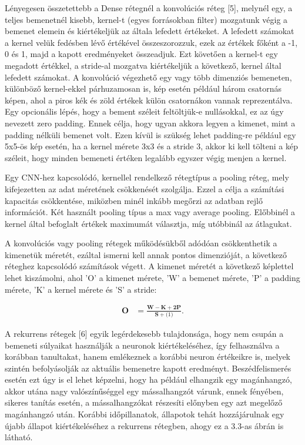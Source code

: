 Lényegesen összetettebb a Dense rétegnél a konvolúciós réteg [5], melynél egy, a teljes bemenetnél kisebb, kernel-t (egyes forrásokban filter) mozgatunk végig a bemenet elemein és kiértékeljük az általa lefedett értékeket. A lefedett számokat a kernel velük fedésben lévő értékével összeszorozzuk, ezek az értékek főként a -1, 0 és 1, majd a kapott eredményeket összeadjuk. Ezt követően a kernel-t egy megadott értékkel, a stride-al mozgatva kiértékeljük a következő, kernel által lefedett számokat. A konvolúció végezhető egy vagy több dimenziós bemeneten, különböző kernel-ekkel párhuzamosan is, kép esetén például három csatornás képen, ahol a piros kék és zöld értékek külön csatornákon vannak reprezentálva. Egy opcionális lépés, hogy a bement széleit feltöltjük-e nullásokkal, ez az úgy nevezett zero padding. Ennek célja, hogy ugyan akkora legyen a kimenet, mint a padding nélküli bemenet volt. Ezen kívül is szükség lehet padding-re például egy 5x5-ös kép esetén, ha a kernel mérete 3x3 és a stride 3, akkor ki kell tölteni a kép széleit, hogy minden bemeneti értéken legalább egyszer végig menjen a kernel.

Egy CNN-hez kapcsolódó, kernellel rendelkező rétegtípus a pooling réteg, mely kifejezetten az adat méretének csökkenését szolgálja. Ezzel a célja a számítási kapacitás csökkentése, miközben minél inkább megőrzi az adatban rejlő információt. Két használt pooling típus a max vagy average pooling. Előbbinél a kernel által befoglalt értékek maximumát választja, míg utóbbinál az átlagukat.

A konvolúciós vagy pooling rétegek működésükből adódóan csökkenthetik a kimenetük méretét, ezáltal ismerni kell annak pontos dimenzióját, a következő réteghez kapcsolódó számítások végett. A kimenet méretét a következő képlettel lehet kiszámolni, ahol ’O’ a kimenet mérete, ’W’ a bemenet mérete, ’P’ a padding mérete, ’K’ a kernel mérete és ’S’ a stride:

\begin{align}
\mathbf{O}&=\frac{\mathbf{W}-\mathbf{K}+\mathbf{2P}}{\mathbf{S}+\mathbf(1)}.
\end{align}

A rekurrens rétegek [6] egyik legérdekesebb tulajdonsága, hogy nem csupán a bemeneti súlyaikat használják a neuronok kiértékeléséhez, így felhasználva a korábban tanultakat, hanem emlékeznek a korábbi neuron értékeikre is, melyek szintén befolyásolják az aktuális bemenetre kapott eredményt. Beszédfelismerés esetén ezt úgy is el lehet képzelni, hogy ha például elhangzik egy magánhangzó, akkor utána nagy valószínűséggel egy mássalhangzót várunk, ennek fényében, sikeres tanítás esetén, a mássalhangzókat részesíti előnyben egy azt megelőző magánhangzó után. Korábbi időpillanatok, állapotok tehát hozzájárulnak egy újabb állapot kiértékeléséhez a rekurrens rétegben, ahogy ez a 3.3-as ábrán is látható.
 
